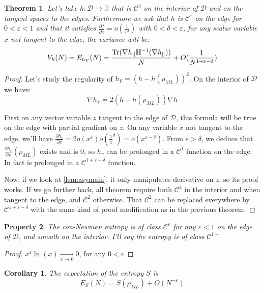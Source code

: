 \documentclass[10pt,a4paper]{report}
\theoremstyle{plain}
\newtheorem{thm}{Theorem}[chapter]
\newtheorem{prop}[thm]{Property}
\newtheorem{cor}{Corollary}[thm]
\theoremstyle{definition}
\theoremstyle{remark}
\newcommand{\R}{\ensuremath{\mathbb{R}}}
\newcommand{\dpar}[2]{\frac{\partial{#1}}{\partial{#2}}}
\DeclareMathOperator{\Tr}{Tr}
\newcommand{\class}[1]{{\mathscr{C}^{#1}}}
\newcommand{\ml}{_{M\!L}}
\begin{document}
\begin{thm}\label{thm:asyvarS}
  Let's take $h : \mathcal{D} \to \R$ that is $\class 3$ on the interior of
  $\mathcal{D}$ and  on the tangent spaces to the edges. Furthermore we ask that
  $h$ is $\class\varepsilon$ on the edge for $0 < \varepsilon < 1$ and that it satisfies
  $\dpar f x = o(\frac1{x^{\delta}})$ with $0 < \delta < \varepsilon$,
  for any scalar variable $x$ not tangent to the edge, the variance will be:
  \[V_h(N) = E_{h_V}(N) = \frac{\Tr(\nabla h\pr \mathbb H\inv(\nabla h\pr))}N
    +O(\frac 1 {N^{1 + \varepsilon - \delta}})\]
\end{thm}

\begin{proof}
  Let's study the regularity of $h_V = {(h - h(\rho\ml))}^2$. On the interior of
  $\mathcal{D}$ we have:
  \[\nabla h_V = 2(h-h(\rho\ml))\nabla h\]

  First on any vector variable $z$ tangent to the edge of $\mathcal{D}$, this formula
  will be true on the edge with partial gradient on $z$. On any variable $x$ not
  tangent to the edge, we'll have $\dpar {h_v} x = 2
  o(x^\varepsilon)o(\frac1x^{\delta}) = o(x^{\varepsilon - \delta})$. From
  $\varepsilon > \delta$, we deduce that
  $\dpar {h_v} x(\rho\ml)$ exists and is $0$, so $h_v$ can be prolonged in a
  $\class 1$ function on the edge. In fact is prolonged in a $\class {1 +
    \varepsilon - \delta}$ function.

  Now, if we look at \cref{lem:asymain}, it only manipulates derivative on $z$,
  so its proof works. If we go further back, all theorem require both $\class 3$
  in the interior and when tangent to the edge, and $\class 2$ otherwise. That
  $\class 2$ can be replaced everywhere by $\class {1 + \varepsilon - \delta}$
  with the same kind of proof modification as in the previous theorem.
\end{proof}

\begin{prop}
The con-Newman entropy is of class $\class \varepsilon$ for any
$\varepsilon < 1$ on the edge of $\mathcal{D}$, and smooth on the interior.
I'll say the entropy is of class $\class{1-}$
\end{prop}

\begin{proof}
  $x^\varepsilon \ln(x) \xrightarrow[x\to0]{} 0$, for any $0< \varepsilon$
\end{proof}

\begin{cor}
  The expectation of the entropy $S$ is
  \[E_S(N) = S(\rho\ml) + O(N^{-\varepsilon})\]
\end{cor}
\end{document}
